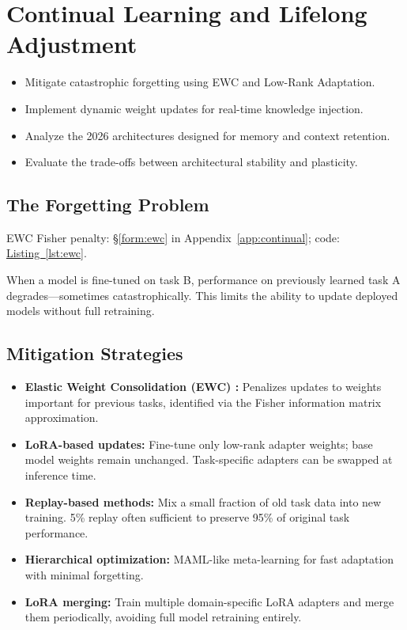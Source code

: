 \chapter{Continual Learning and Lifelong Adjustment}
\minitoc

\begin{chapteroverview}
  \begin{itemize}
    \item Mitigate catastrophic forgetting using EWC and Low-Rank Adaptation.
    \item Implement dynamic weight updates for real-time knowledge injection.
    \item Analyze the 2026 architectures designed for memory and context retention.
    \item Evaluate the trade-offs between architectural stability and plasticity.
  \end{itemize}
\end{chapteroverview}

\section{The Forgetting Problem}

EWC Fisher penalty: \hyperref[form:ewc]{\S\ref*{form:ewc}} in Appendix~\ref{app:continual}; code: \hyperref[lst:ewc]{Listing~\ref*{lst:ewc}}.

When a model is fine-tuned on task B, performance on previously learned task A degrades---sometimes catastrophically. This limits the ability to update deployed models without full retraining.

\section{Mitigation Strategies}

\begin{itemize}
  \item \textbf{Elastic Weight Consolidation (EWC) \parencite{kirkpatrick2017overcoming}:} Penalizes updates to weights important for previous tasks, identified via the Fisher information matrix approximation.
  \item \textbf{LoRA-based updates:} Fine-tune only low-rank adapter weights; base model weights remain unchanged. Task-specific adapters can be swapped at inference time.
  \item \textbf{Replay-based methods:} Mix a small fraction of old task data into new training. 5\% replay often sufficient to preserve 95\% of original task performance.
  \item \textbf{Hierarchical optimization:} MAML-like meta-learning for fast adaptation with minimal forgetting.
  \item \textbf{LoRA merging:} Train multiple domain-specific LoRA adapters and merge them periodically, avoiding full model retraining entirely.
\end{itemize}

